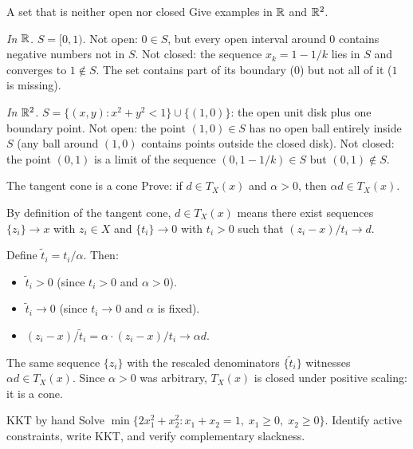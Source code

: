 \begin{exercise}{A set that is neither open nor closed}\label{ex:neither-open-nor-closed}
	Give examples in $\mathbb{R}$ and $\mathbb{R}^2$.
\end{exercise}

\solution
\textit{In $\mathbb{R}$.}
$S = [0, 1)$.
Not open: $0 \in S$, but every open interval around $0$ contains negative numbers not in $S$.
Not closed: the sequence $x_k = 1 - 1/k$ lies in $S$ and converges to $1 \notin S$.
The set contains part of its boundary ($0$) but not all of it ($1$ is missing).

\textit{In $\mathbb{R}^2$.}
$S = \{(x, y) : x^2 + y^2 < 1\} \cup \{(1, 0)\}$: the open unit disk plus one boundary point.
Not open: the point $(1, 0) \in S$ has no open ball entirely inside $S$ (any ball around $(1,0)$ contains points outside the closed disk).
Not closed: the point $(0, 1)$ is a limit of the sequence $(0, 1 - 1/k) \in S$ but $(0, 1) \notin S$.

\begin{exercise}{The tangent cone is a cone}\label{ex:tangent-cone-is-cone}
	Prove: if $d \in T_X(x)$ and $\alpha > 0$, then $\alpha d \in T_X(x)$.
\end{exercise}

\solution
By definition of the tangent cone, $d \in T_X(x)$ means there exist sequences $\{z_i\} \to x$ with $z_i \in X$ and $\{t_i\} \to 0$ with $t_i > 0$ such that $(z_i - x)/t_i \to d$.

Define $\tilde{t}_i = t_i / \alpha$.
Then:
\begin{itemize}
	\item $\tilde{t}_i > 0$ (since $t_i > 0$ and $\alpha > 0$).
	\item $\tilde{t}_i \to 0$ (since $t_i \to 0$ and $\alpha$ is fixed).
	\item $(z_i - x)/\tilde{t}_i = \alpha \cdot (z_i - x)/t_i \to \alpha d$.
\end{itemize}
The same sequence $\{z_i\}$ with the rescaled denominators $\{\tilde{t}_i\}$ witnesses $\alpha d \in T_X(x)$.
Since $\alpha > 0$ was arbitrary, $T_X(x)$ is closed under positive scaling: it is a cone.

\begin{exercise}{KKT by hand}\label{ex:kkt-solve}
	Solve $\min\{2x_1^2 + x_2^2 : x_1 + x_2 = 1,\; x_1 \geq 0,\; x_2 \geq 0\}$.
	Identify active constraints, write KKT, and verify complementary slackness.
\end{exercise}

